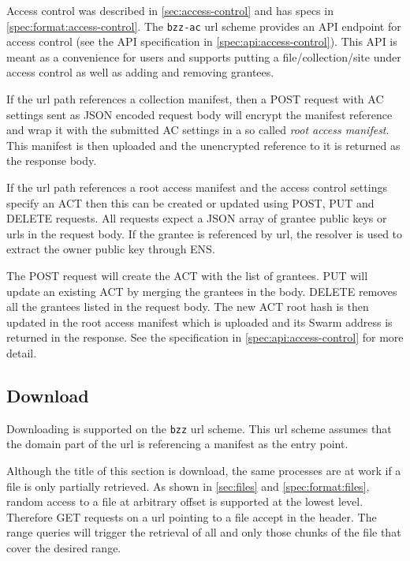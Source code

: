 Access control was described in \ref{sec:access-control} and has specs in \ref{spec:format:access-control}. The \texttt{bzz-ac} url scheme provides an API endpoint for access control (see the API specification in \ref{spec:api:access-control}). This API is meant as a convenience for users and supports putting a file/collection/site under access control as well as adding and removing grantees.

If the url path references a collection manifest, then a POST request with AC settings sent as JSON encoded request body will encrypt the manifest reference and wrap it with the submitted AC settings in a so called \emph{root access manifest}. This manifest is then  uploaded and the unencrypted reference to it is returned as the response body. 

If the url path references a root access manifest and the access control settings specify an ACT then this can be created or updated using POST, PUT and DELETE requests. All requests expect a JSON array of grantee public keys or urls in the request body. If the grantee is referenced by url, the resolver is used to extract the owner public key through ENS.

The POST request will create the ACT with the list of grantees. PUT will update an existing ACT by merging the grantees in the body. DELETE removes all the grantees listed in the request body. The new ACT root hash is then updated in the root access manifest which is uploaded and its Swarm address is returned in the response. See the specification in  \ref{spec:api:access-control} for more detail.


\subsection{Download}\label{sec:download}

Downloading is supported on the \texttt{bzz} url scheme. This url scheme assumes that the domain part of the url is referencing a manifest as the entry point. 

Although the title of this section is download, the same  processes are at work if a file is only partially retrieved. As shown in \ref{sec:files} and \ref{spec:format:files}, random access to a file at arbitrary offset is supported at the lowest level. Therefore GET requests on a url pointing to a file accept  in the header. The range queries will trigger the retrieval of all and only those chunks of the file that cover the desired range.  

